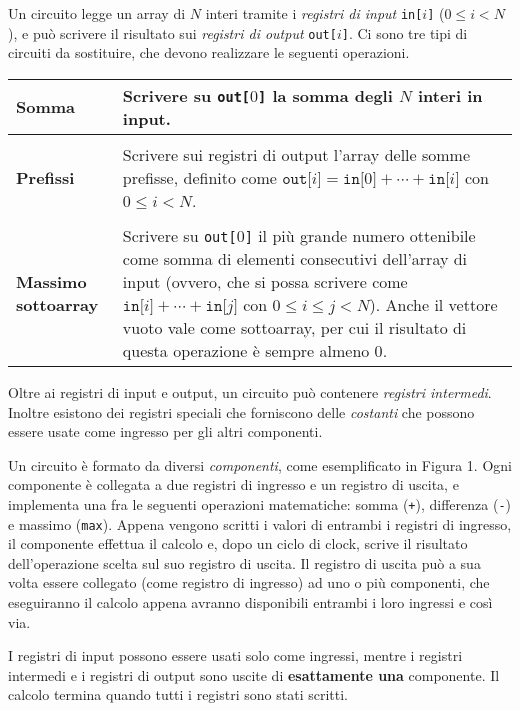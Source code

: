 Un circuito legge un array di $N$ interi
tramite i \emph{registri di input} \texttt{in[$i$]} ($0 \le i < N$),
e può scrivere il risultato sui \emph{registri di output} \texttt{out[$i$]}.
Ci sono tre tipi di circuiti da sostituire, che devono realizzare le seguenti operazioni.

\begin{table}[H]
	\begin{tabularx}{\textwidth}{l|X}
		\textbf{Somma} &
		Scrivere su \texttt{out[$0$]} la somma degli $N$ interi in input.\\[5pt]
		\hline \\[-10pt]
		\textbf{Prefissi} &
		Scrivere sui registri di output l'array delle somme prefisse, definito come
		$\texttt{out[$i$]} = \texttt{in[$0$]} + \cdots + \texttt{in[$i$]}$ con $0 \le i < N$.\\[5pt]
		\hline \\[-10pt]
		\textbf{Massimo sottoarray} &
		Scrivere su \texttt{out[$0$]} il più grande numero ottenibile come somma di elementi consecutivi dell'array di input
		(ovvero, che si possa scrivere come $\texttt{in[$i$]} + \cdots + \texttt{in[$j$]}$ con $0 \le i \le j < N$). Anche il vettore
		vuoto vale come sottoarray, per cui il risultato di questa operazione è sempre almeno $0$.
	\end{tabularx}
\end{table}

Oltre ai registri di input e output,
un circuito può contenere \emph{registri intermedi}.
Inoltre esistono dei registri speciali che forniscono delle
\emph{costanti} che possono essere usate come ingresso per gli altri componenti.

Un circuito è formato da diversi \emph{componenti}, come esemplificato in Figura 1.
Ogni componente è collegata a due registri di ingresso e un registro di uscita,
e implementa una fra le seguenti operazioni matematiche:
somma (\texttt{+}), differenza (\texttt{-}) e massimo (\texttt{max}).
Appena vengono scritti i valori di entrambi i registri di ingresso,
il componente effettua il calcolo e, dopo un ciclo di clock,
scrive il risultato dell'operazione scelta sul suo registro di uscita.
Il registro di uscita può a sua volta essere collegato (come registro di ingresso) ad uno o più componenti, che eseguiranno il calcolo appena avranno disponibili entrambi i loro ingressi e così via.

I registri di input possono essere usati solo come ingressi,
mentre i registri intermedi e i registri di output
sono uscite di \textbf{esattamente una} componente.
Il calcolo termina quando tutti i registri sono stati scritti.

